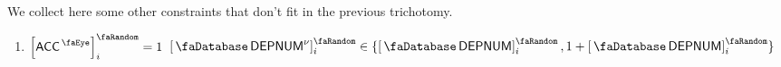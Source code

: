 We collect here some other constraints that don't fit in the previous trichotomy.
\begin{enumerate}
	\item
		\If $\order{\peekAccount} _{i} = 1$
		\Then $\order{\accDeploymentNumber \new }_{i} \in \{ \order{\accDeploymentNumber  }_{i}, 1 + \order{\accDeploymentNumber  }_{i} \}$
\end{enumerate}
